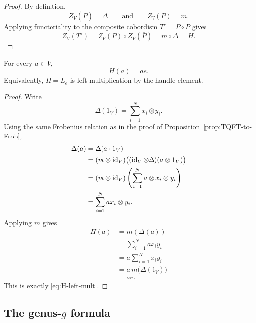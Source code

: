 \begin{proof}
By definition,
\begin{equation*}
Z_V(\overline{P})=\Delta
\qquad\text{and}\qquad
Z_V(P)=m.
\end{equation*}
Applying functoriality to the composite cobordism $T^\circ=P\circ \overline{P}$ gives
\begin{equation*}
Z_V(T^\circ)=Z_V(P)\circ Z_V(\overline{P})=m\circ\Delta=H.
\end{equation*}
\end{proof}

\begin{proposition}\label{prop:H-is-mult-by-e}
For every $a \in V$,
\begin{equation}\label{eq:H-left-mult}
H(a)=ae.
\end{equation}
Equivalently, $H=L_e$ is left multiplication by the handle element.
\end{proposition}

\begin{proof}
Write
\begin{equation}\label{eq:Delta-one-expansion}
\Delta(1_V)=\sum_{i=1}^N x_i \otimes y_i.
\end{equation}
Using the same Frobenius relation as in the proof of Proposition~\ref{prop:TQFT-to-Frob},
\begin{align}
\Delta(a)
&= \Delta(a\cdot 1_V) \label{eq:Delta-a-handle-start} \\
&= (m \otimes \operatorname{id}_V)\bigl((\operatorname{id}_V \otimes \Delta)(a \otimes 1_V)\bigr) \nonumber \\
&= (m \otimes \operatorname{id}_V)\left(\sum_{i=1}^N a \otimes x_i \otimes y_i\right) \nonumber \\
&= \sum_{i=1}^N a x_i \otimes y_i. \label{eq:Delta-a-handle}
\end{align}
Applying $m$ gives
\begin{align}
H(a)
&= m(\Delta(a)) \label{eq:H-a-first} \\
&= \sum_{i=1}^N a x_i y_i \nonumber \\
&= a \sum_{i=1}^N x_i y_i \nonumber \\
&= a\, m\bigl(\Delta(1_V)\bigr) \nonumber \\
&= ae. \label{eq:H-a-last}
\end{align}
This is exactly \eqref{eq:H-left-mult}.
\end{proof}

\subsection{The genus-\texorpdfstring{$g$}{g} formula}

